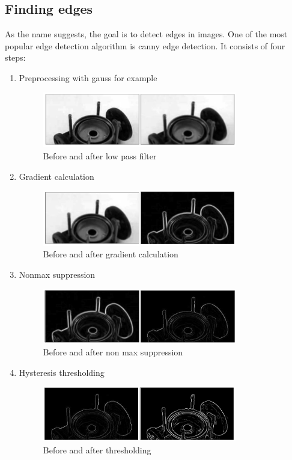 \documentclass[12pt]{article}
\begin{document}
\subsection{Finding edges}
As the name suggests, the goal is to detect edges in images.
One of the most popular edge detection algorithm is canny edge detection.
\newline
It consists of four steps:
\begin{enumerate}  
    \item Preprocessing with gauss for example
    \begin{figure}[!htb]
         \centering
         \includegraphics[width=0.8\textwidth]{pics/canny1}
         \caption{Before and after low pass filter}
    \end{figure}

    \item Gradient calculation
    \begin{figure}[!htb]
        \centering
        \includegraphics[width=0.8\textwidth]{pics/canny2}
        \caption{Before and after gradient calculation}
    \end{figure}

    \item Nonmax suppression
    \begin{figure}[!htb]
        \centering
        \includegraphics[width=0.8\textwidth]{pics/canny3}
        \caption{Before and after non max suppression}  
    \end{figure}

    \item Hysteresis thresholding
    \begin{figure}[!htb]
        \centering
        \includegraphics[width=0.8\textwidth]{pics/canny4}
        \caption{Before and after thresholding}
    \end{figure}

    \end{enumerate}
\end{document}
